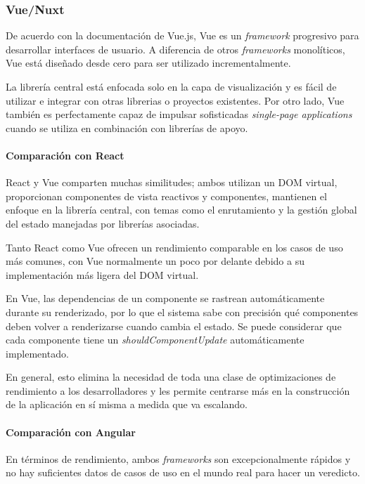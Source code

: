 \subsubsection*{Vue/Nuxt}

De acuerdo con la documentación de Vue.js\cite{noauthor_que_nodate}, Vue es un \textit{framework} progresivo para desarrollar interfaces de usuario. A diferencia de otros \textit{frameworks} monolíticos, Vue está diseñado desde cero para ser utilizado incrementalmente.


La librería central está enfocada solo en la capa de visualización y es fácil de utilizar e integrar con otras librerias o proyectos existentes. Por otro lado, Vue también es perfectamente capaz de impulsar sofisticadas \textit{single-page applications} cuando se utiliza en combinación con librerías de apoyo.


\paragraph*{Comparación con React}

React y Vue comparten muchas similitudes; ambos utilizan un DOM virtual, proporcionan componentes de vista reactivos y componentes, mantienen el enfoque en la librería central, con temas como el enrutamiento y la gestión global del estado manejadas por librerías asociadas.


Tanto React como Vue ofrecen un rendimiento comparable en los casos de uso más comunes, con Vue normalmente un poco por delante debido a su implementación más ligera del DOM virtual.


En Vue, las dependencias de un componente se rastrean automáticamente durante su renderizado, por lo que el sistema sabe con precisión qué componentes deben volver a renderizarse cuando cambia el estado. Se puede considerar que cada componente tiene un \textit{shouldComponentUpdate} automáticamente implementado.


En general, esto elimina la necesidad de toda una clase de optimizaciones de rendimiento a los desarrolladores y les permite centrarse más en la construcción de la aplicación en sí misma a medida que va escalando.

\paragraph*{Comparación con Angular}
En términos de rendimiento, ambos \textit{frameworks} son excepcionalmente rápidos y no hay suficientes datos de casos de uso en el mundo real para hacer un veredicto.


